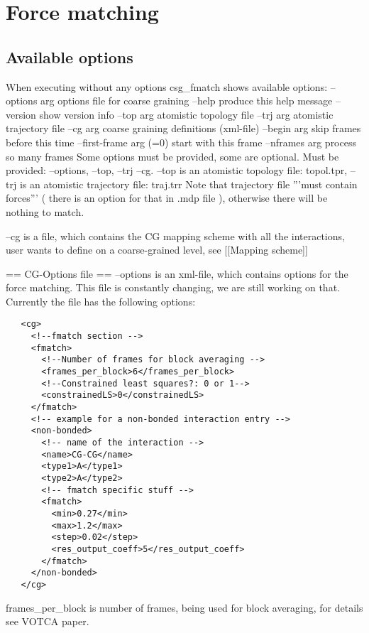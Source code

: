 \section{Force matching}
\subsection{Available options}
When executing without any options csg\_fmatch shows available options:
  --options arg          options file for coarse graining
  --help                 produce this help message
  --version              show version info
  --top arg              atomistic topology file
  --trj arg              atomistic trajectory file
  --cg arg               coarse graining definitions (xml-file)
  --begin arg            skip frames before this time
  --first-frame arg (=0) start with this frame
  --nframes arg          process so many frames
Some options must be provided, some are optional. Must be provided: --options, --top, --trj --cg.
--top is an atomistic topology file: topol.tpr, --trj is an atomistic trajectory file: traj.trr
Note that trajectory file '''must contain forces''' ( there is an option for that in .mdp file ), otherwise there will be nothing to match.

--cg is a file, which contains the CG mapping scheme with all the interactions, user wants to define on a coarse-grained level, see [[Mapping scheme]]

== CG-Options file ==
--options is an xml-file, which contains options for the force matching. This file is constantly changing, we are still working on that.
Currently the file has the following options:
\begin{verbatim}
   <cg>
     <!--fmatch section -->
     <fmatch>
       <!--Number of frames for block averaging -->
       <frames_per_block>6</frames_per_block>
       <!--Constrained least squares?: 0 or 1-->
       <constrainedLS>0</constrainedLS>
     </fmatch>
     <!-- example for a non-bonded interaction entry -->
     <non-bonded>
       <!-- name of the interaction -->
       <name>CG-CG</name>
       <type1>A</type1>
       <type2>A</type2>
       <!-- fmatch specific stuff -->
       <fmatch>
         <min>0.27</min>
         <max>1.2</max>
         <step>0.02</step>
         <res_output_coeff>5</res_output_coeff>
       </fmatch>
     </non-bonded>
   </cg>
\end{verbatim}

frames\_per\_block is number of frames, being used for block averaging, for details see VOTCA paper.

